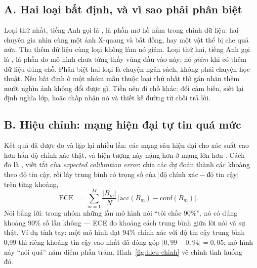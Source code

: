 \documentclass[../../deep_learning.tex]{subfiles}
\begin{document}
\subsection{A. Hai loại bất định, và vì sao phải phân biệt}
Loại thứ nhất, tiếng Anh gọi là , là phần mơ hồ nằm trong chính dữ liệu: hai chuyên gia nhìn cùng một ảnh X-quang và bất đồng, hay một vật thể bị che quá nửa. Thu thêm dữ liệu cùng loại không làm nó giảm. Loại thứ hai, tiếng Anh gọi là , là phần do mô hình chưa từng thấy vùng đầu vào này; nó \emph{giảm} khi có thêm dữ liệu đúng chỗ. Phân biệt hai loại là chuyện ngân sách, không phải chuyện học thuật. Nếu bất định ở một nhóm mẫu thuộc loại thứ nhất thì gán nhãn thêm mười nghìn ảnh không đổi được gì. Tiền nên đi chỗ khác: đổi cảm biến, siết lại định nghĩa lớp, hoặc chấp nhận nó và thiết kế đường từ chối trả lời.

\subsection{B. Hiệu chỉnh: mạng hiện đại tự tin quá mức}
Kết quả đã được đo và lặp lại nhiều lần: các mạng sâu hiện đại cho xác suất cao hơn hẳn độ chính xác thật, và hiện tượng này nặng hơn ở mạng lớn hơn \cite{guo2017calibration}. Cách đo là , viết tắt của \emph{expected calibration error}: chia các dự đoán thành các khoảng theo độ tin cậy, rồi lấy trung bình có trọng số của \(\lvert \text{độ chính xác} - \text{độ tin cậy} \rvert\) trên từng khoảng,
\[
\mathrm{ECE} \;=\; \sum_{m=1}^{M} \frac{|B_m|}{N}\,\bigl\lvert \mathrm{acc}(B_m) - \mathrm{conf}(B_m) \bigr\rvert .
\]
Nói bằng lời: trong nhóm những lần mô hình nói ``tôi chắc 90\%'', nó có đúng khoảng 90\% số lần không --- ECE đo khoảng cách trung bình giữa lời nói và sự thật. Ví dụ tính tay: một mô hình đạt 94\% chính xác với độ tin cậy trung bình 0,99 thì riêng khoảng tin cậy cao nhất đã đóng góp \(\lvert 0{,}99-0{,}94\rvert = 0{,}05\); mô hình này ``nói quá'' năm điểm phần trăm. Hình~\ref{fig:hieu-chinh} vẽ chính tình huống đó.
\end{document}
